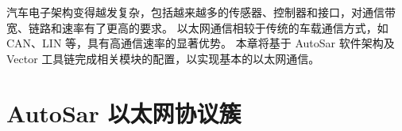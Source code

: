 汽车电子架构变得越发复杂，包括越来越多的传感器、控制器和接口，对通信带宽、链路和速率有了更高的要求。
以太网通信相较于传统的车载通信方式，如 CAN、LIN 等，具有高通信速率的显著优势。
本章将基于 AutoSar 软件架构及 Vector 工具链完成相关模块的配置，以实现基本的以太网通信。

\section{AutoSar 以太网协议簇}



